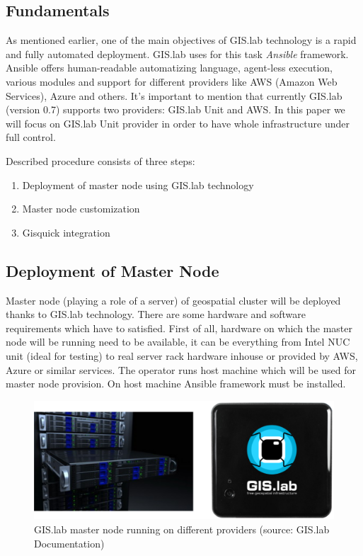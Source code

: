 \documentclass{isprs}
\begin{document}
\subsection{Fundamentals}

As mentioned earlier, one of the main objectives of GIS.lab technology
is a rapid and fully automated deployment. GIS.lab uses for this task
\textit{Ansible} framework. Ansible offers human-readable
automatizing language, agent-less execution, various modules and
support for different providers like AWS (Amazon Web Services), Azure
and others. It's important to mention that currently GIS.lab (version
0.7) supports two providers: GIS.lab Unit and AWS. In this paper we
will focus on GIS.lab Unit provider in order to have whole
infrastructure under full control.

Described procedure consists of three steps:

\begin{enumerate}
\setlength\itemsep{0em}\setlength\parskip{0em}\setlength\topsep{0em}\setlength\partopsep{0em}\setlength\parsep{0em}
\item{Deployment of master node using GIS.lab technology} 
\item{Master node customization}
\item{Gisquick integration}
\end{enumerate}

\subsection{Deployment of Master Node}\label{Deployment of Master Node}

Master node (playing a role of a server) of geospatial cluster will be
deployed thanks to GIS.lab technology. There are some hardware and
software requirements which have to satisfied. First of all, hardware
on which the master node will be running need to be available, it can
be everything from Intel NUC unit (ideal for testing) to real server
rack hardware inhouse or provided by AWS, Azure or similar
services. The operator runs host machine which will be used for master
node provision. On host machine Ansible framework must be installed.

\begin{figure}[ht!]
\begin{center}
  \includegraphics[width=0.9\columnwidth]{figures/gislab-unit.png}
  \caption{GIS.lab master node running on different providers (source:
    GIS.lab Documentation)}
\label{fig:gislab_infrastructure}
\end{center}
\end{figure}
\end{document}
